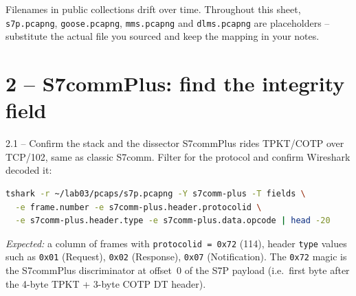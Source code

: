 \documentclass[11pt,a4paper]{article}
\begin{document}
\begin{notebox}
Filenames in public collections drift over time. Throughout this sheet,
\texttt{s7p.pcapng}, \texttt{goose.pcapng}, \texttt{mms.pcapng} and
\texttt{dlms.pcapng} are placeholders -- substitute the actual file you
sourced and keep the mapping in your notes.
\end{notebox}

\section*{2 -- S7commPlus: find the integrity field}

\begin{stepbox}{2.1 -- Confirm the stack and the dissector}
S7commPlus rides TPKT/COTP over TCP/102, same as classic S7comm. Filter
for the protocol and confirm Wireshark decoded it:
\begin{lstlisting}[language=bash]
tshark -r ~/lab03/pcaps/s7p.pcapng -Y s7comm-plus -T fields \
  -e frame.number -e s7comm-plus.header.protocolid \
  -e s7comm-plus.header.type -e s7comm-plus.data.opcode | head -20
\end{lstlisting}
\emph{Expected:} a column of frames with \texttt{protocolid = 0x72} (114),
header \texttt{type} values such as \texttt{0x01} (Request),
\texttt{0x02} (Response), \texttt{0x07} (Notification). The \texttt{0x72}
magic is the S7commPlus discriminator at offset~0 of the S7P payload
(i.e.\ first byte after the 4-byte TPKT + 3-byte COTP DT header).
\end{stepbox}
\end{document}
